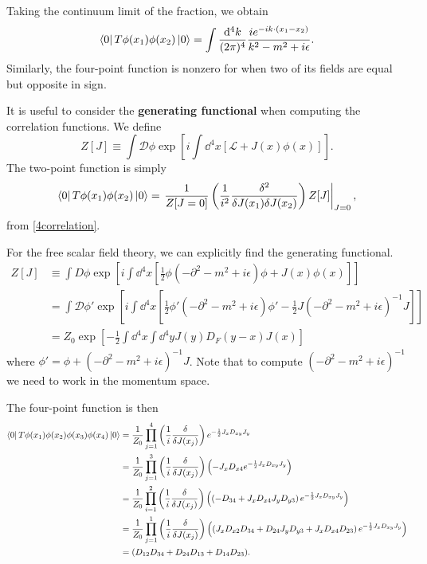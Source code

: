 \documentclass{article}
\begin{document}
Taking the continuum limit of the fraction, we obtain
\begin{equation}
    \bra 0T\phi(x_1)\phi(x_2)\ket 0=\int\frac{\dd^4k}{(2\pi)^4}\frac{ie^{-ik\cdot(x_1-x_2)}}{k^2-m^2+i\epsilon}.
\end{equation}
Similarly, the four-point function is nonzero for when two of its fields are equal but opposite in sign.

It is useful to consider the \textbf{generating functional} when computing the correlation functions. We define 
\begin{equation}
    Z[J]\equiv\int\mathcal D\phi\exp\left[i\int\dd^4x\left[\mathcal L+J(x)\phi(x)\right]\right].
\end{equation}
The two-point function is simply 
\begin{equation}
    \bra 0T\phi(x_1)\phi(x_2)\ket 0=\left.\frac 1{Z[J=0]}\left(\frac 1{i^2}\frac{\delta^2}{\delta J(x_1)\delta J(x_2)}\right)Z[J]\right|_{J=0},
\end{equation}
from \eqref{4correlation}.

For the free scalar field theory, we can explicitly find the generating functional. 
\begin{align*}
    Z[J]&\equiv\int D\phi\exp\left[i\int\dd^4x\left[\frac 12\phi(-\partial^2-m^2+i\epsilon)\phi+J(x)\phi(x)\right]\right]\\
    &=\int\mathcal D\phi'\exp\left[i\int\dd^4x\left[\frac 12\phi'(-\partial^2-m^2+i\epsilon)\phi'-\frac 12J(-\partial^2-m^2+i\epsilon)^{-1}J\right]\right]\\
    &=Z_0\exp\left[-\frac 12\int\dd^4x\int\dd^4yJ(y)D_F(y-x)J(x)\right]
\end{align*}
where $\phi'=\phi+(-\partial^2-m^2+i\epsilon)^{-1}J$. Note that to compute $(-\partial^2-m^2+i\epsilon)^{-1}$ we need to work in the momentum space.

The four-point function is then 
\begin{align*}
    \bra 0T\phi(x_1)\phi(x_2)\phi(x_3)\phi(x_4)\ket 0&=\frac 1{Z_0}\prod^4_{j=1}\left(\frac 1i\frac{\delta}{\delta J(x_j)}\right)e^{-\frac 12J_xD_{xy}J_y}\\
    &=\frac 1{Z_0}\prod^3_{j=1}\left(\frac 1i\frac{\delta}{\delta J(x_j)}\right)\left(-J_xD_{x4}e^{-\frac 12J_xD_{xy}J_y}\right)\\
    &=\frac 1{Z_0}\prod^2_{i=1}\left(\frac 1i\frac{\delta}{\delta J(x_j)}\right)\left(\left(-D_{34}+J_xD_{x4}J_yD_{y3}\right)e^{-\frac 12J_xD_{xy}J_y}\right)\\
    &=\frac 1{Z_0}\prod^1_{j=1}\left(\frac 1i\frac\delta{\delta J(x_j)}\right)\left(\left(J_xD_{x2}D_{34}+D_{24}J_yD_{y3}+J_xD_{x4}D_{23}\right)e^{-\frac 12J_xD_{xy}J_y}\right)\\
    &=(D_{12}D_{34}+D_{24}D_{13}+D_{14}D_{23}).
\end{align*}    
\end{document}
